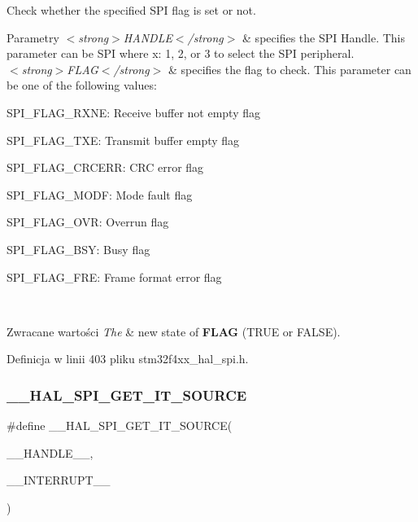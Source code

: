 Check whether the specified S\+PI flag is set or not. 


\begin{DoxyParams}{Parametry}
{\em $<$strong$>$\+H\+A\+N\+D\+L\+E$<$/strong$>$} & specifies the S\+PI Handle. This parameter can be S\+PI where x\+: 1, 2, or 3 to select the S\+PI peripheral. \\
\hline
{\em $<$strong$>$\+F\+L\+A\+G$<$/strong$>$} & specifies the flag to check. This parameter can be one of the following values\+: \begin{DoxyItemize}
\item S\+P\+I\+\_\+\+F\+L\+A\+G\+\_\+\+R\+X\+NE\+: Receive buffer not empty flag \item S\+P\+I\+\_\+\+F\+L\+A\+G\+\_\+\+T\+XE\+: Transmit buffer empty flag \item S\+P\+I\+\_\+\+F\+L\+A\+G\+\_\+\+C\+R\+C\+E\+RR\+: C\+RC error flag \item S\+P\+I\+\_\+\+F\+L\+A\+G\+\_\+\+M\+O\+DF\+: Mode fault flag \item S\+P\+I\+\_\+\+F\+L\+A\+G\+\_\+\+O\+VR\+: Overrun flag \item S\+P\+I\+\_\+\+F\+L\+A\+G\+\_\+\+B\+SY\+: Busy flag \item S\+P\+I\+\_\+\+F\+L\+A\+G\+\_\+\+F\+RE\+: Frame format error flag \end{DoxyItemize}
\\
\hline
\end{DoxyParams}

\begin{DoxyRetVals}{Zwracane wartości}
{\em The} & new state of {\bfseries F\+L\+AG} (T\+R\+UE or F\+A\+L\+SE). \\
\hline
\end{DoxyRetVals}


Definicja w linii 403 pliku stm32f4xx\+\_\+hal\+\_\+spi.\+h.

\mbox{\label{group___s_p_i___exported___macros_gabdaab061e4603331a0ec4b9d651df0b5}} 
\subsubsection{\texorpdfstring{\+\_\+\+\_\+\+H\+A\+L\+\_\+\+S\+P\+I\+\_\+\+G\+E\+T\+\_\+\+I\+T\+\_\+\+S\+O\+U\+R\+CE}{\_\_HAL\_SPI\_GET\_IT\_SOURCE}}
{\footnotesize\ttfamily \#define \+\_\+\+\_\+\+H\+A\+L\+\_\+\+S\+P\+I\+\_\+\+G\+E\+T\+\_\+\+I\+T\+\_\+\+S\+O\+U\+R\+CE(\begin{DoxyParamCaption}\item[{}]{\+\_\+\+\_\+\+H\+A\+N\+D\+L\+E\+\_\+\+\_\+,  }\item[{}]{\+\_\+\+\_\+\+I\+N\+T\+E\+R\+R\+U\+P\+T\+\_\+\+\_\+ }\end{DoxyParamCaption})}

